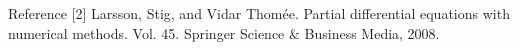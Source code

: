 \documentclass[final, 20pt]{beamer}
\newlength{\onecolwid}
\begin{document}
\begin{frame}[t]
\begin{columns}[t]
\begin{column}{\onecolwid}
\begin{alertblock}{Reference}
[2] Larsson, Stig, and Vidar Thomée. Partial differential equations with numerical methods. Vol. 45. Springer Science & Business Media, 2008.

\noident
\vspace{0.5cm}

\vspace{0.5cm}

\end{alertblock}

%
%
%
%


%
%
%



\end{column} %

\end{columns} %

\end{frame} %
\end{document}
